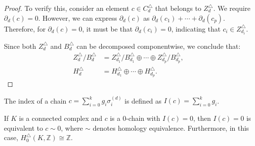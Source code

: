 \begin{proof}
	To verify this, consider an element \( c \in C^{\triangle}_{d} \) that belongs to \( Z^{\triangle}_{d} \). We require \( \partial_{d}(c) = 0 \). However, we can express \( \partial_{d}(c) \) as \( \partial_{d}(c_{1}) + \cdots + \partial_{d}(c_{p}) \). Therefore, for \( \partial_{d}(c) = 0 \), it must be that \( \partial_{d}(c_{i}) = 0 \), indicating that \( c_{i} \in Z^{\triangle}_{d_i} \).
				
	Since both \( Z^{\triangle}_{d} \) and \( B^{\triangle}_{d} \) can be decomposed componentwise, we conclude that:
	\begin{align}
		Z^{\triangle}_{d} / B^{\triangle}_{d} &= Z^{\triangle}_{d_1} / B^{\triangle}_{d_1} \oplus \cdots \oplus Z^{\triangle}_{d_p} / B^{\triangle}_{d_p}, \\
		H^{\triangle}_{d} &= H^{\triangle}_{d_1} \oplus \cdots \oplus H^{\triangle}_{d_p}. 
	\end{align}
\end{proof}

\begin{definition}[Index]
The index of a chain $c = \sum_{i=0}^{k} g_i \sigma_i^{(d)}$ is defined as $I(c) = \sum_{i=0}^kg_i$.
\end{definition}

\begin{proposition}{\cite[Proposition 2.7]{hatcher2005algebraic}}
	\label{decomp}
	If \( K \) is a connected complex and \( c \) is a \( 0 \)-chain with \( I(c) = 0 \), then \( I(c) = 0 \) is equivalent to \( c \sim 0 \), where \( \sim \) denotes homology equivalence. Furthermore, in this case, \( H^{\triangle}_{0}(K, \mathbb{Z}) \cong \mathbb{Z} \).
\end{proposition}

